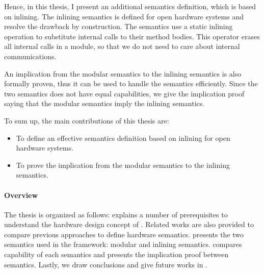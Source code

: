 Hence, in this thesis, I present an additional semantics definition,
which is based on inlining.  The inlining semantics is defined for
open hardware systems and resolve the drawback by construction.  The
semantics use a static inlining operation to substitute internal calls
to their method bodies. This operator erases all internal calls in a
module, so that we do not need to care about internal communications.

An implication from the modular semantics to the inlining semantics is
also formally proven, thus it can be used to handle the semantics
efficiently. Since the two semantics does not have equal capabilities,
we give the implication proof saying that the modular semantics imply
the inlining semantics.

To sum up, the main contributions of this thesis are:
\begin{itemize}
\item To define an effective semantics definition based on inlining
  for open hardware systems.
\item To prove the implication from the modular semantics to the
  inlining semantics.
\end{itemize}

\paragraph{Overview}

The thesis is organized as follows: 
explains a number of prerequisites to understand the hardware design
concept of \Bluespec{}. Related works are also provided to compare
previous approaches to define hardware
semantics.  presents the two semantics used in
the \Kami{} framework: modular and inlining
semantics.  compares capability of each
semantics and presents the implication proof between
semantics. Lastly, we draw conclusions and give future works in
.





